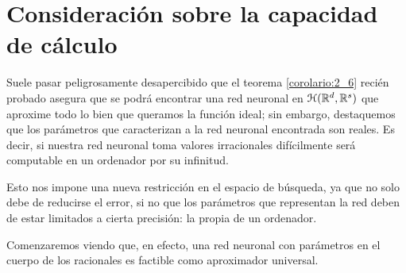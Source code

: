 \section{Consideración sobre la capacidad de cálculo}

Suele pasar peligrosamente desapercibido que el teorema  \ref{corolario:2_6} recién probado asegura
que se podrá encontrar una red neuronal en $\mathcal{H}(\mathbb{R}^d,\mathbb{R}^s)$
que aproxime todo lo bien que queramos la función ideal; sin embargo, destaquemos que los parámetros que caracterizan a la red neuronal encontrada son reales. Es decir, 
si nuestra red neuronal toma valores irracionales difícilmente será computable en un ordenador por su infinitud. 

Esto nos impone una nueva restricción en el espacio de búsqueda, ya que no solo debe de reducirse el error, si no que los parámetros que representan la red deben de estar limitados a cierta precisión: la propia de un ordenador.


Comenzaremos viendo que, en efecto, una red neuronal con parámetros en el cuerpo de los racionales es factible como aproximador universal. 

